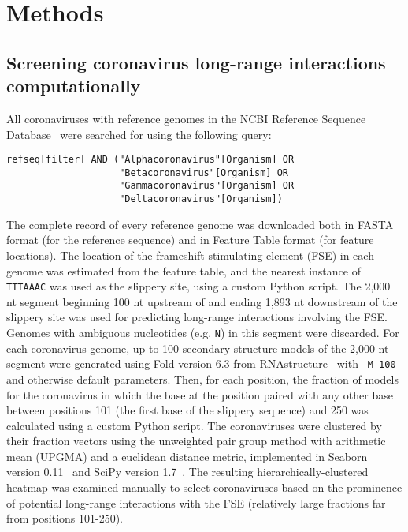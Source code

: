 \documentclass[main.tex]{subfiles}
\begin{document}
\section{Methods}
\label{methods}


\subsection{Screening coronavirus long-range interactions computationally}
\label{screen_lri_comp}

All coronaviruses with reference genomes in the NCBI Reference Sequence Database~\cite{OLeary2016} were searched for using the following query:
\begin{verbatim}
refseq[filter] AND ("Alphacoronavirus"[Organism] OR
                    "Betacoronavirus"[Organism] OR
                    "Gammacoronavirus"[Organism] OR
                    "Deltacoronavirus"[Organism])
\end{verbatim}
The complete record of every reference genome was downloaded both in FASTA format (for the reference sequence) and in Feature Table format (for feature locations).
The location of the frameshift stimulating element (FSE) in each genome was estimated from the feature table, and the nearest instance of \verb|TTTAAAC| was used as the slippery site, using a custom Python script.
The 2,000 nt segment beginning 100 nt upstream of and ending 1,893 nt downstream of the slippery site was used for predicting long-range interactions involving the FSE.
Genomes with ambiguous nucleotides (e.g. \verb|N|) in this segment were discarded.
For each coronavirus genome, up to 100 secondary structure models of the 2,000 nt segment were generated using Fold version 6.3 from RNAstructure~\cite{Mathews2004a} with \verb|-M 100| and otherwise default parameters.
Then, for each position, the fraction of models for the coronavirus in which the base at the position paired with any other base between positions 101 (the first base of the slippery sequence) and 250 was calculated using a custom Python script.
The coronaviruses were clustered by their fraction vectors using the unweighted pair group method with arithmetic mean (UPGMA) and a euclidean distance metric, implemented in Seaborn version 0.11~\cite{Waskom2021} and SciPy version 1.7~\cite{Virtanen2020}.
The resulting hierarchically-clustered heatmap was examined manually to select coronaviruses based on the prominence of potential long-range interactions with the FSE (relatively large fractions far from positions 101-250).
\end{document}
